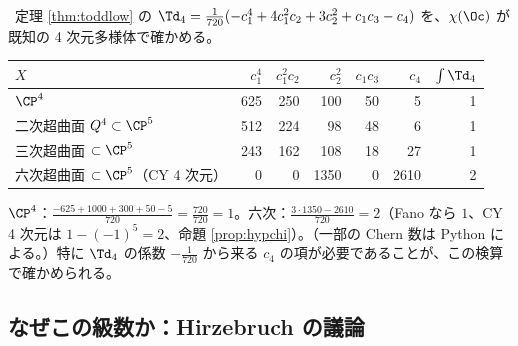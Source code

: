 \begin{ex}[$\Td_4$ の検算]\label{ex:Td4}\tP\
定理 \ref{thm:toddlow} の $\Td_4=\frac1{720}(-c_1^4+4c_1^2c_2+3c_2^2+c_1c_3-c_4)$ を、$\chi(\Oc)$ が既知の 4 次元多様体で確かめる。
\begin{center}
\begin{tabular}{l|rrrrr|r}
\toprule
$X$ & $c_1^4$ & $c_1^2c_2$ & $c_2^2$ & $c_1c_3$ & $c_4$ & $\int\Td_4$\\
\midrule
$\CP^4$ & 625 & 250 & 100 & 50 & 5 & 1\\
二次超曲面 $Q^4\subset\CP^5$ & 512 & 224 & 98 & 48 & 6 & 1\\
三次超曲面 $\subset\CP^5$ & 243 & 162 & 108 & 18 & 27 & 1\\
六次超曲面 $\subset\CP^5$（CY 4 次元） & 0 & 0 & 1350 & 0 & 2610 & 2\\
\bottomrule
\end{tabular}
\end{center}
$\CP^4$：$\frac{-625+1000+300+50-5}{720}=\frac{720}{720}=1$。六次：$\frac{3\cdot1350-2610}{720}=2$（Fano なら $1$、CY 4 次元は $1-(-1)^5=2$、命題 \ref{prop:hypchi}）。（一部の Chern 数は Python による。）特に $\Td_4$ の係数 $-\frac1{720}$ から来る $c_4$ の項が必要であることが、この検算で確かめられる。
\end{ex}
\subsection{なぜこの級数か：Hirzebruch の議論}

